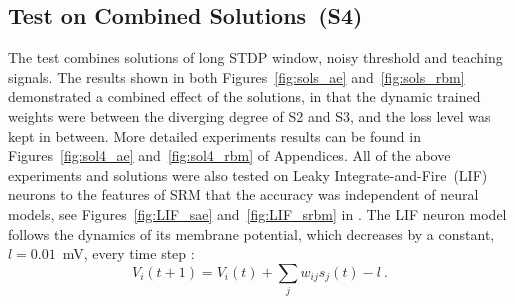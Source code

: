 \subsection{Test on Combined Solutions~(S4)}
The test combines solutions of long STDP window, noisy threshold and teaching signals.
The results shown in both Figures~\ref{fig:sols_ae} and~\ref{fig:sols_rbm} demonstrated a combined effect of the solutions, in that the dynamic trained weights were between the diverging degree of S2 and S3, and the loss level was kept in between.
More detailed experiments results can be found in Figures~\ref{fig:sol4_ae} and~\ref{fig:sol4_rbm} of Appendices.
All of the above experiments and solutions were also tested on Leaky Integrate-and-Fire~(LIF) neurons to \DIFdelbegin {}\DIFdelend \DIFaddbegin {}\DIFaddend the features of \DIFaddbegin {}\DIFaddend SRM that the accuracy was independent of neural models, see Figures~\ref{fig:LIF_sae} and~\ref{fig:LIF_srbm} in \DIFdelbegin {}\DIFdelend \DIFaddbegin {}\DIFaddend .
The LIF neuron model follows the dynamics of its membrane potential, which decreases by a constant, $l=0.01$~mV, every time step :
\begin{equation}
V_i(t+1)=V_i(t) + \sum_j w_{ij} s_j(t) - l~.
\end{equation}
